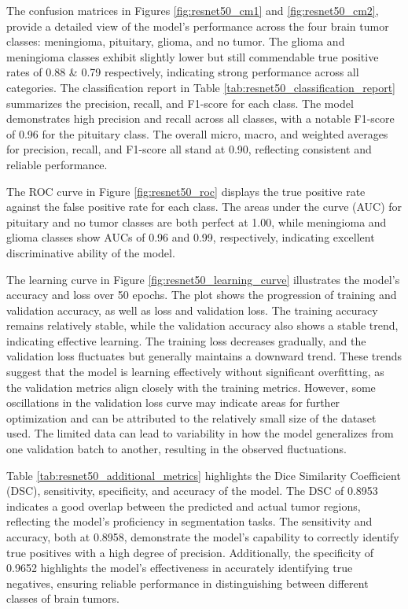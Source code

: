 The confusion matrices in Figures \ref{fig:resnet50_cm1} and \ref{fig:resnet50_cm2}, provide a detailed view of the model's performance across the four brain tumor classes: meningioma, pituitary, glioma, and no tumor. The glioma and meningioma classes exhibit slightly lower but still commendable true positive rates of 0.88 & 0.79 respectively, indicating strong performance across all categories. The classification report in Table \ref{tab:resnet50_classification_report} summarizes the precision, recall, and F1-score for each class. The model demonstrates high precision and recall across all classes, with a notable F1-score of 0.96 for the pituitary class. The overall micro, macro, and weighted averages for precision, recall, and F1-score all stand at 0.90, reflecting consistent and reliable performance.

The ROC curve in Figure \ref{fig:resnet50_roc} displays the true positive rate against the false positive rate for each class. The areas under the curve (AUC) for pituitary and no tumor classes are both perfect at 1.00, while meningioma and glioma classes show AUCs of 0.96 and 0.99, respectively, indicating excellent discriminative ability of the model.

The learning curve in Figure \ref{fig:resnet50_learning_curve} illustrates the model's accuracy and loss over 50 epochs. The plot shows the progression of training and validation accuracy, as well as loss and validation loss. The training accuracy remains relatively stable, while the validation accuracy also shows a stable trend, indicating effective learning. The training loss decreases gradually, and the validation loss fluctuates but generally maintains a downward trend. These trends suggest that the model is learning effectively without significant overfitting, as the validation metrics align closely with the training metrics. However, some oscillations in the validation loss curve may indicate areas for further optimization and can be attributed to the relatively small size of the dataset used. The limited data can lead to variability in how the model generalizes from one validation batch to another, resulting in the observed fluctuations.

Table \ref{tab:resnet50_additional_metrics} highlights the Dice Similarity Coefficient (DSC), sensitivity, specificity, and accuracy of the model. The DSC of 0.8953 indicates a good overlap between the predicted and actual tumor regions, reflecting the model's proficiency in segmentation tasks. The sensitivity and accuracy, both at 0.8958, demonstrate the model's capability to correctly identify true positives with a high degree of precision. Additionally, the specificity of 0.9652 highlights the model's effectiveness in accurately identifying true negatives, ensuring reliable performance in distinguishing between different classes of brain tumors.

